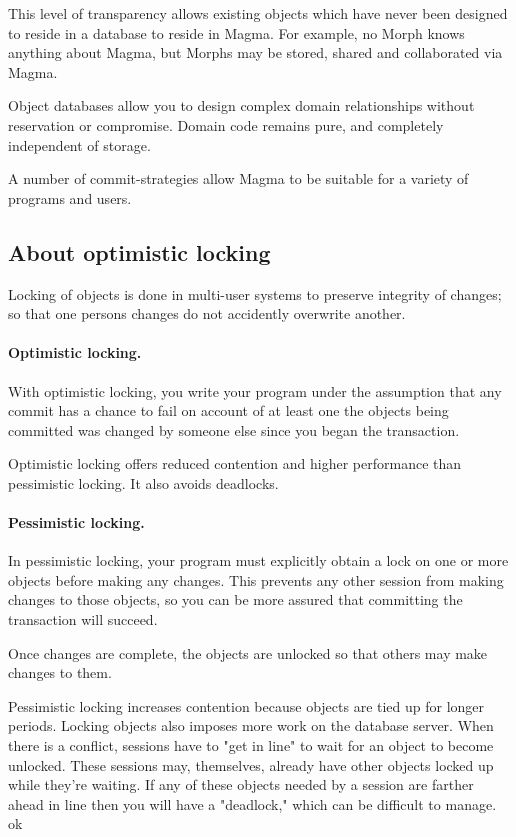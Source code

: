\documentclass[a4paper,10pt,twoside]{book}
\begin{document}
This level of transparency allows existing objects which have never been designed to reside in a database to reside in Magma. For example, no Morph knows anything about Magma, but Morphs may be stored, shared and collaborated via Magma.

Object databases allow you to design complex domain relationships without reservation or compromise. Domain code remains pure, and completely independent of storage. 

A number of commit-strategies allow Magma to be suitable for a variety of programs and users.

\subsection{About optimistic locking}

Locking of objects is done in multi-user systems to preserve integrity of changes; so that one persons changes do not accidently overwrite another.

\paragraph{Optimistic locking.}

With optimistic locking, you write your program under the assumption that any commit has a chance to fail on account of at least one the objects being committed was changed by someone else since you began the transaction.

Optimistic locking offers reduced contention and higher performance than pessimistic locking. It also avoids deadlocks.

\paragraph{Pessimistic locking.}
In pessimistic locking, your program must explicitly obtain a lock on one or more objects before making any changes. This prevents any other session from making changes to those objects, so you can be more assured that committing the transaction will succeed.

Once changes are complete, the objects are unlocked so that others may make changes to them.

Pessimistic locking increases contention because objects are tied up for longer periods. Locking objects also imposes more work on the database server. When there is a conflict, sessions have to "get in line" to wait for an object to become unlocked. These sessions may, themselves, already have other objects locked up while they're waiting. If any of these objects needed by a session are farther ahead in line then you will have a "deadlock," which can be difficult to manage. ok
\end{document}
